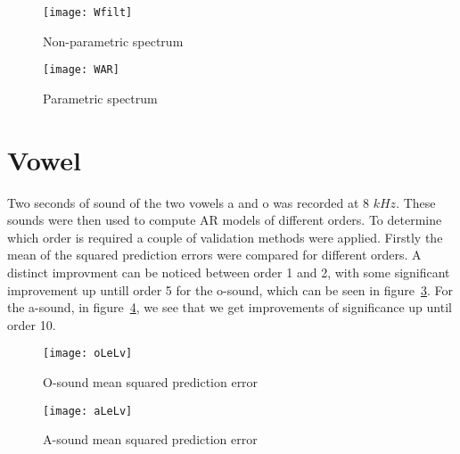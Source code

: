 \documentclass[10pt]{article}
\begin{document}
\begin{figure}[!hp]

    \begin{center}
      \texttt{[image: Wfilt]}
    \caption{Non-parametric spectrum \label{fig:Wfilt}}
    \end{center}

\end{figure}

\begin{figure}[!hp]

    \begin{center}
      \texttt{[image: WAR]}
    \caption{Parametric spectrum \label{fig:WAR}}
    \end{center}

\end{figure}


\section{Vowel}
Two seconds of sound of the two vowels a and o was recorded at
8 $kHz$. These sounds were then used to compute AR models of
different orders. To determine which order is required a couple of validation
methods were applied. Firstly the mean of the squared prediction errors were compared for different
orders. A distinct improvment can be noticed between order 1 and 2, with some
significant improvement up untill order 5 for the o-sound, which can be seen in
figure~\ref{fig:oLeLv}. For the a-sound, in figure~\ref{fig:aLeLv}, we see that
 we get improvements of significance up until order 10.


\begin{figure}[!hp]

    \begin{center}
      \texttt{[image: oLeLv]}
    \caption{O-sound mean squared prediction error \label{fig:oLeLv}}
    \end{center}

\end{figure}

\begin{figure}[!hp]

    \begin{center}
      \texttt{[image: aLeLv]}
    \caption{A-sound mean squared prediction error \label{fig:aLeLv}}
    \end{center}

\end{figure}
\end{document}
